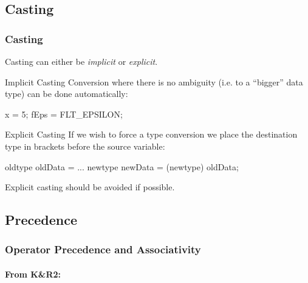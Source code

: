 \documentclass[smaller,table]{beamer}
\begin{document}
\subsection{Casting}
\begin{frame}[fragile]
\frametitle{Casting}
Casting can either be \emph{implicit} or \emph{explicit}.
\begin{block}{Implicit Casting}
Conversion where there is no ambiguity (i.e. to a ``bigger'' data type) can be done automatically:
\begin{semiverbatim}
\small{} x = 5; 
 fEps = FLT\_EPSILON; 
\end{semiverbatim}
\end{block}

\begin{block}{Explicit Casting}
If we wish to force a type conversion we place the destination type in brackets before the source variable:
\begin{semiverbatim}
oldtype oldData = ...
newtype newData = (newtype) oldData;
\end{semiverbatim}
Explicit casting should be avoided if possible.
\end{block}
\end{frame}


\subsection{Precedence}
\begin{frame}
\frametitle{Operator Precedence and Associativity}
\framesubtitle{From K\&R2:}
\begin{columns}
\begin{column}{9cm}
\end{column}
\end{columns}
\end{frame}
\end{document}
